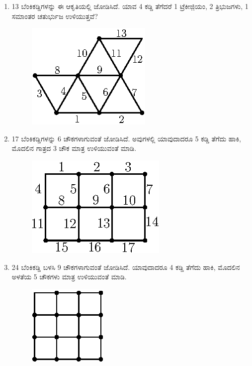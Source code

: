 \begin{enumerate}
\item 13 ಬೆಂಕಿಕಡ್ಡಿಗಳನ್ನು ಈ ಆಕೃತಿಯಲ್ಲಿ ಜೋಡಿಸಿದೆ. ಯಾವ 4 ಕಡ್ಡಿ ತೆಗೆದರೆ 1 ಟ್ರೆಕೀಜಿ಼ಯಂ, 2 ತ್ರಿಭುಜಗಳು, 1 ಸಮಾಂತರ ಚತುರ್ಭುಜ ಉಳಿಯುತ್ತವೆ?
\begin{figure}[H]
\centering
\includegraphics[scale=1.1]{images/chap3/q13.eps}
\end{figure}

\item 17 ಬೆಂಕಿಕಡ್ಡಿಗಳನ್ನು 6 ಚೌಕಗಳಾಗುವಂತೆ ಜೋಡಿಸಿದೆ. ಅವುಗಳಲ್ಲಿ ಯಾವುದಾದರೂ 5 ಕಡ್ಡಿ ತೆಗೆದು ಹಾಕಿ, ಮೊದಲಿನ  ಗಾತ್ರದ 3 ಚೌಕ ಮಾತ್ರ ಉಳಿಯುವಂತೆ ಮಾಡಿ.
\begin{figure}[H]
\centering
\includegraphics[scale=1.1]{images/chap3/q14.eps}
\end{figure}

\item 24 ಬೆಂಕಿಕಡ್ಡಿ ಬಳಸಿ 9 ಚೌಕಗಳಾಗುವಂತೆ ಜೋಡಿಸಿದೆ. ಯಾವುದಾದರೂ 4 ಕಡ್ಡಿ ತೆಗೆದು ಹಾಕಿ, ಮೊದಲಿನ ಅಳತೆಯ 5 ಚೌಕಗಳು ಮಾತ್ರ ಉಳಿಯುವಂತೆ ಮಾಡಿ.
\begin{figure}[H]
\centering
\includegraphics[scale=1.2]{images/chap3/q15.eps}
\end{figure}

\eject


\end{enumerate}
